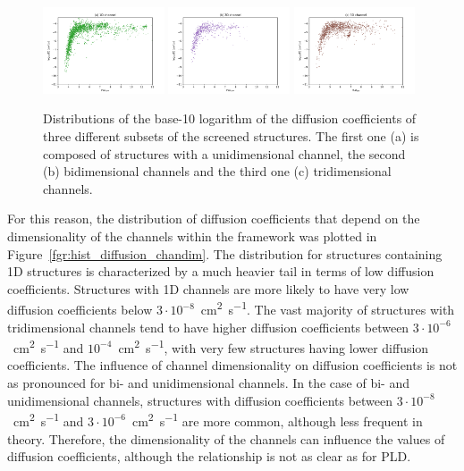 \documentclass[main]{subfiles}
\begin{document}
\begin{figure}[ht]
  \centering
    \includegraphics[width=0.32\textwidth]{figures/5-diffusion/D_log-PLD_1D_chan.pdf}
    \includegraphics[width=0.32\textwidth]{figures/5-diffusion/D_log-PLD_2D_chan.pdf}
    \includegraphics[width=0.32\textwidth]{figures/5-diffusion/D_log-PLD_3D_chan.pdf}
    \caption{ Distributions of the base-10 logarithm of the diffusion coefficients of three different subsets of the screened structures. The first one (a) is composed of structures with a unidimensional channel, the second (b) bidimensional channels and the third one (c) tridimensional channels. }\label{fgr:scatter_diffusion_chandim}
\end{figure}

For this reason, the distribution of diffusion coefficients that depend on the dimensionality of the channels within the framework was plotted in Figure~\ref{fgr:hist_diffusion_chandim}. The distribution for structures containing 1D structures is characterized by a much heavier tail in terms of low diffusion coefficients. Structures with 1D channels are more likely to have very low diffusion coefficients below $3\cdot10^{-8}$~\si{\square\cm\per\s}. The vast majority of structures with tridimensional channels tend to have higher diffusion coefficients between $3\cdot10^{-6}$~\si{\square\cm\per\s} and $10^{-4}$~\si{\square\cm\per\s}, with very few structures having lower diffusion coefficients. The influence of channel dimensionality on diffusion coefficients is not as pronounced for bi- and unidimensional channels. In the case of bi- and unidimensional channels, structures with diffusion coefficients between $3\cdot10^{-8}$~\si{\square\cm\per\s} and $3\cdot10^{-6}$~\si{\square\cm\per\s} are more common, although less frequent in theory. Therefore, the dimensionality of the channels can influence the values of diffusion coefficients, although the relationship is not as clear as for PLD.
\end{document}
